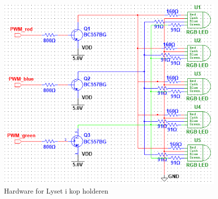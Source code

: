 \documentclass[HardwareDesign/HardwareDesign_main.tex]{subfiles}
\begin{document}
\begin{figure}[H]
    \centering
    \includegraphics[width=\textwidth]{HardwareDesign/CupLight/graphics/CupHolder_HW.png}
    \caption{Hardware for Lyset i kop holderen}
    \label{fig:CupHolder_HW}
\end{figure}
\end{document}
